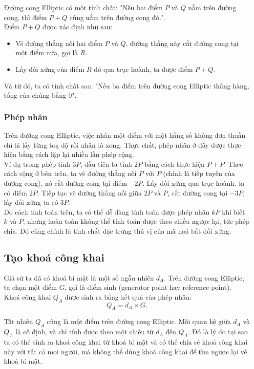 Đường cong Elliptic có một tính chất: "Nếu hai điểm $P$ và $Q$ nằm trên đường cong, thì điểm $P+Q$ cũng nằm trên đường cong đó.".\\

Điểm $P+Q$ được xác định như sau:
\begin{itemize}
    \item Vẽ đường thẳng nối hai điểm $P$ và $Q$, đường thẳng này cắt đường cong tại một điểm nữa, gọi là $R$.
    \item Lấy đối xứng của điểm $R$ đó qua trục hoành, ta được điểm $P+Q$.
\end{itemize}

Và từ đó, ta có tính chất sau: "Nếu ba điểm trên đường cong Elliptic thẳng hàng, tổng của chúng bằng $0$".

\subsubsection*{Phép nhân}

Trên đường cong Elliptic, việc nhân một điểm với một hằng số không đơn thuần chỉ là lấy từng toạ độ rồi nhân là xong. Thực chất, phép nhân ở đây được thực hiện bằng cách lặp lại nhiều lần phép cộng.\\

Ví dụ trong phép tính $3P$, đầu tiên ta tính $2P$ bằng cách thực hiện $P+P$. Theo cách cộng ở bên trên, ta vẽ đường thẳng nối $P$ với $P$ (chính là tiếp tuyến của đường cong), nó cắt đường cong tại điểm $-2P$. Lấy đối xứng qua trục hoành, ta có điểm $2P$. Tiếp tục vẽ đường thẳng nối giữa $2P$ và $P$, cắt đường cong tại $-3P$, lấy đối xứng ta có $3P$.\\

Do cách tính toán trên, ta có thể dễ dàng tính toán được phép nhân $kP$ khi biết $k$ và $P$, nhưng hoàn toàn không thể tính toán được theo chiều ngược lại, tức phép chia. Đó cũng chính là tính chất đặc trưng thú vị của mã hoá bất đối xứng.

\subsection{Tạo khoá công khai}

Giả sử ta đã có khoá bí mật là một số ngẫu nhiên $d_A$. Trên đường cong Elliptic, ta chọn một điểm $G$, gọi là điểm sinh (generator point hay reference point).\\

Khoá công khai $Q_A$ được sinh ra bằng kết quả của phép nhân:
$$
Q_A=d_A\times G.
$$

Tất nhiên $Q_A$ cũng là một điểm trên đường cong Elliptic. Mối quan hệ giữa $d_A$ và $Q_A$ là cố định, và chỉ tính được theo một chiều từ $d_A$ đến $Q_A$. Đó là lý do tại sao ta có thể sinh ra khoá công khai từ khoá bí mật và có thể chia sẻ khoá công khai này với tất cả mọi người, mà không thể dùng khoá công khai để tìm ngược lại về khoá bí mật.